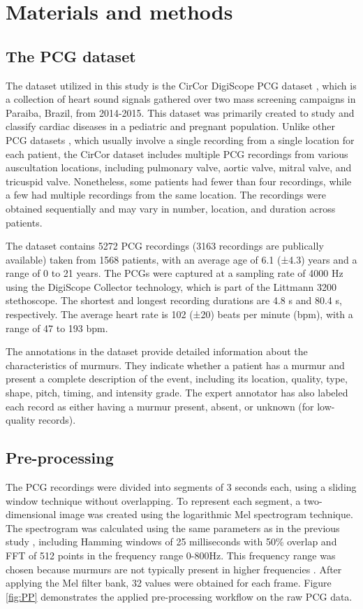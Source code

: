 \documentclass{article}
\begin{document}
\section{Materials and methods}
\subsection{The PCG dataset}
The dataset utilized in this study is the CirCor DigiScope PCG dataset \cite{Reyna2022.08.11.22278688,oliveira2021circor}, which is a collection of heart sound signals gathered over two mass screening campaigns in Paraiba, Brazil, from 2014-2015. This dataset was primarily created to study and classify cardiac diseases in a pediatric and pregnant population. Unlike other PCG datasets \cite{clifford2016classification,kazemnejad2021open}, which usually involve a single recording from a single location for each patient, the CirCor dataset includes multiple PCG recordings from various auscultation locations, including pulmonary valve, aortic
valve, mitral valve, and tricuspid valve. Nonetheless, some patients had fewer than four recordings, while a few had multiple recordings from the same location. The recordings were obtained sequentially and may vary in number, location, and duration across patients.

\par The dataset contains 5272 PCG recordings (3163 recordings are publically available) taken from 1568 patients, with an average age of 6.1 (±4.3) years and a range of 0 to 21 years. The PCGs were captured at a sampling rate of 4000 Hz using the DigiScope Collector technology, which is part of the Littmann 3200 stethoscope. The shortest and longest recording durations are 4.8 s and 80.4 s, respectively. The average heart rate is 102 (±20) beats per minute (bpm), with a range of 47 to 193 bpm.

\par The annotations in the dataset provide detailed information about the characteristics of murmurs. They indicate whether a patient has a murmur and present a complete description of the event, including its location, quality, type, shape, pitch, timing, and intensity grade. The expert annotator has also labeled each record as either having a murmur present, absent, or unknown (for low-quality records).


\subsection{Pre-processing}
The PCG recordings were divided into segments of 3 seconds each, using a sliding window technique without overlapping. To represent each segment, a two-dimensional image was created using the logarithmic Mel spectrogram technique. The spectrogram was calculated using the same parameters as in the previous study \cite{elola2022beyond}, including Hamming windows of 25 milliseconds with 50\% overlap and FFT of 512 points in the frequency range 0-800Hz. This frequency range was chosen because murmurs are not typically present in higher frequencies \cite{mcgee2018auscultation}. After applying the Mel filter bank, 32 values were obtained for each frame. Figure \ref{fig:PP} demonstrates the applied pre-processing workflow on the raw PCG data.
\end{document}
